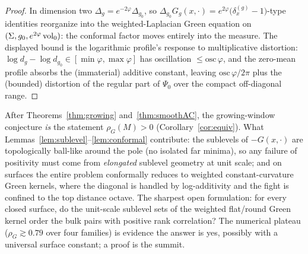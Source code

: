\begin{proof}
In dimension two $\Delta_g=e^{-2\varphi}\Delta_{g_0}$, so
$\Delta_{g_0}G_g(x,\cdot)=e^{2\varphi}\bigl(\delta^{(g)}_x-1\bigr)$-type
identities reorganize into the weighted-Laplacian Green equation on
$(\Sigma,g_0,e^{2\varphi}\operatorname{vol}_0)$: the conformal factor moves entirely into the
measure.  The displayed bound is the logarithmic profile's response to multiplicative
distortion: $\log d_g-\log d_{g_0}\in[\min\varphi,\max\varphi]$ has oscillation
$\le\mathrm{osc}\,\varphi$, and the zero-mean profile absorbs the (immaterial)
additive constant, leaving $\mathrm{osc}\,\varphi/2\pi$ plus the (bounded)
distortion of the regular part of $\Psi_0$ over the compact off-diagonal range.
\end{proof}

\begin{remark}\label{rem:crux}
After Theorems~\ref{thm:growing} and~\ref{thm:smoothAC}, the growing-window
conjecture \emph{is} the statement $\rho_G(M)>0$ (Corollary~\ref{cor:equiv}).
What Lemmas~\ref{lem:sublevel}--\ref{lem:conformal} contribute: the sublevels of
$-G(x,\cdot)$ are topologically ball-like around the pole (no isolated far
minima), so any failure of positivity must come from \emph{elongated} sublevel
geometry at unit scale; and on surfaces the entire problem conformally reduces
to weighted constant-curvature Green kernels, where the diagonal is handled by
log-additivity and the fight is confined to the top distance octave.  The
sharpest open formulation: for every closed surface, do the unit-scale sublevel
sets of the weighted flat/round Green kernel order the bulk pairs with positive
rank correlation?  The numerical plateau ($\rho_G\gtrsim0.79$ over four
families) is evidence the answer is yes, possibly with a universal surface
constant; a proof is the summit.
\end{remark}
